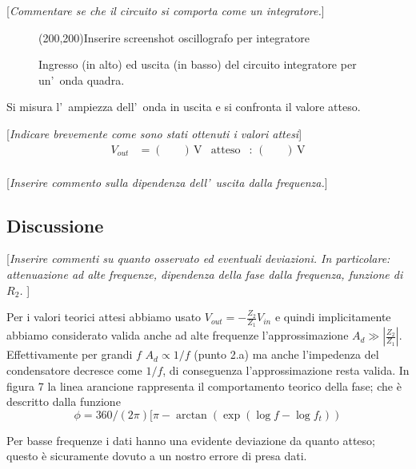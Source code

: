 \documentclass[10pt,a4paper]{article}
\newcommand{\rem}[1]{[\emph{#1}]}
\newcommand{\exn}{\phantom{xxx}}
\begin{document}
	\rem{Commentare se che il circuito si comporta come un integratore.}
	\begin{figure}[htb]
		\begin{center}
			\framebox(200,200){Inserire screenshot oscillografo per integratore}
		\end{center}
		\caption{\small Ingresso (in alto) ed uscita (in basso) del circuito integratore per un'~onda quadra.}
		\label{fig:oscinte}
	\end{figure}
	
	Si misura l'~ampiezza dell'~onda  in uscita e si confronta il valore atteso.
	
	\rem{Indicare brevemente come sono stati ottenuti i valori attesi}
	\begin{align*}
	V_{out} &= (\exn )\,\mathrm{V} & \mathrm{atteso} &:\,(\exn  )\, \mathrm{V}  \\
	\end{align*}
	
	\rem{Inserire commento sulla dipendenza dell'~uscita dalla frequenza.}
	
	\subsection{Discussione}
	
	\rem{Inserire commenti su quanto osservato ed eventuali deviazioni. 
		In particolare: attenuazione ad alte frequenze, dipendenza della fase dalla frequenza, funzione di $R_2$. }

 Per i valori teorici attesi abbiamo usato $V_{out}= -\frac{Z_2}{Z_1} V_{in}$ e quindi implicitamente abbiamo considerato valida anche ad alte  frequenze l'approssimazione $A_d \gg |\frac{Z_2}{Z_1}|$. Effettivamente per grandi $f$  $A_d\propto 1/f$ (punto 2.a) ma anche l'impedenza del condensatore decresce come $1/f$, di conseguenza l'approssimazione resta valida.
	In figura 7  la linea arancione rappresenta il comportamento teorico della fase; che è descritto dalla funzione \[ \phi = 360/(2\pi)[\pi - \arctan(\exp{(\log f -\log f_t)})\] 

Per basse frequenze i dati hanno una evidente deviazione da quanto atteso; questo è sicuramente dovuto a un nostro errore di presa dati.

	\begin{tabular}{cc}

\end{tabular}
\end{document}
